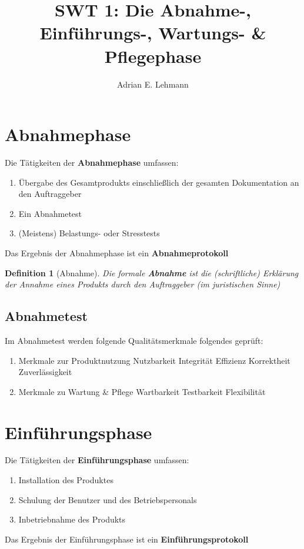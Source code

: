 \documentclass[a4paper]{article}
\title{SWT 1: Die Abnahme-, Einführungs-, Wartungs- \& Pflegephase}
\author{Adrian E. Lehmann}
\theoremstyle{break}
\newtheorem{defi}{Definition}[section]
\begin{document}
	\maketitle
	\tableofcontents
	\newpage

\section{Abnahmephase}
Die Tätigkeiten der \textbf{Abnahmephase} umfassen:
\begin{enumerate}
	\item Übergabe des Gesamtprodukts einschließlich der gesamten Dokumentation an den Auftraggeber
	\item Ein Abnahmetest
	\item (Meistens) Belastungs- oder Stresstests
\end{enumerate}
Das Ergebnis der Abnahmephase ist ein \textbf{Abnahmeprotokoll}
\begin{defi}[Abnahme]
	Die formale \textbf{Abnahme} ist die (schriftliche) Erklärung der Annahme eines Produkts durch den Auftraggeber (im juristischen Sinne)
\end{defi}
	
\subsection{Abnahmetest}
Im Abnahmetest werden folgende Qualitätsmerkmale folgendes geprüft:\newline
\begin{enumerate}
	\item Merkmale zur Produktnutzung
		\subitem Nutzbarkeit
		\subitem Integrität
		\subitem Effizienz
		\subitem Korrektheit 
		\subitem Zuverlässigkeit
	\item Merkmale zu Wartung \& Pflege
		\subitem Wartbarkeit
		\subitem Testbarkeit
		\subitem Flexibilität
\end{enumerate}
\section{Einführungsphase}
Die Tätigkeiten der \textbf{Einführungsphase} umfassen:
\begin{enumerate}
	\item Installation des Produktes
	\item Schulung der Benutzer und des Betriebspersonals
	\item Inbetriebnahme des Produkts
\end{enumerate}
Das Ergebnis der Einführungsphase ist ein \textbf{Einführungsprotokoll}
\end{document}
